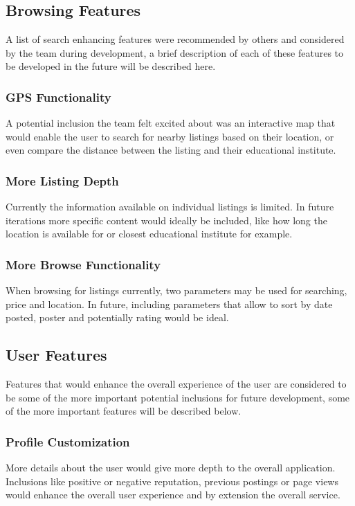 \subsection{Browsing Features}
A list of search enhancing features were recommended by others and considered by the team during development, a brief description of each of these features to be developed in the future will be described here.

\subsubsection{GPS Functionality}
A potential inclusion the team felt excited about was an interactive map that would enable the user to search for nearby listings based on their location, or even compare the distance between the listing and their educational institute.

\subsubsection{More Listing Depth}
Currently the information available on individual listings is limited. In future iterations more specific content would ideally be included, like how long the location is available for or closest educational institute for example.

\subsubsection{More Browse Functionality}
When browsing for listings currently, two parameters may be used for searching, price and location. In future, including parameters that allow to sort by date posted, poster and potentially rating would be ideal.

\subsection{User Features}
Features that would enhance the overall experience of the user are considered to be some of the more important potential inclusions for future development, some of the more important features will be described below.

\subsubsection{Profile Customization}
More details about the user would give more depth to the overall application. Inclusions like positive or negative reputation, previous postings or page views would enhance the overall user experience and by extension the overall service.

